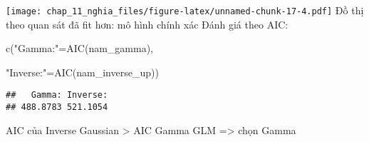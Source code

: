 \documentclass[
]{article}
\newenvironment{Shaded}{\begin{snugshade}}{\end{snugshade}}
\newcommand{\FunctionTok}[1]{\textcolor[rgb]{0.00,0.00,0.00}{#1}}
\newcommand{\NormalTok}[1]{#1}
\newcommand{\OtherTok}[1]{\textcolor[rgb]{0.56,0.35,0.01}{#1}}
\newcommand{\StringTok}[1]{\textcolor[rgb]{0.31,0.60,0.02}{#1}}
\begin{document}
\texttt{[image: chap\_11\_nghia\_files/figure-latex/unnamed-chunk-17-4.pdf]}
Đồ thị theo quan sát đã fit hơn: mô hình chính xác Đánh giá theo AIC:

\begin{Shaded}
\begin{Highlighting}[]
\FunctionTok{c}\NormalTok{(}\StringTok{"Gamma:"}\OtherTok{=}\FunctionTok{AIC}\NormalTok{(nam\_gamma),}

  \StringTok{"Inverse:"}\OtherTok{=}\FunctionTok{AIC}\NormalTok{(nam\_inverse\_up))}
\end{Highlighting}
\end{Shaded}

\begin{verbatim}
##   Gamma: Inverse: 
## 488.8783 521.1054
\end{verbatim}

AIC của Inverse Gaussian \textgreater{} AIC Gamma GLM =\textgreater{}
chọn Gamma
\end{document}
